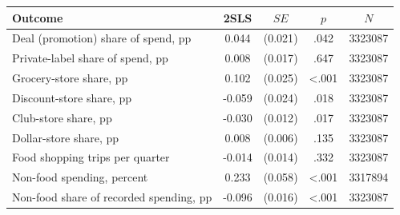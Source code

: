 \setlength{\tabcolsep}{4pt}
\begin{tabular}{
    l
    S[table-format=-1.3, table-space-text-post=\sym{***}, table-align-text-after=false]
    S[table-format=1.3, table-space-text-pre={(}, table-align-text-before=false, table-space-text-post={)}, table-align-text-after=false]
    S[table-format=<1.3, print-zero-integer=false]
    S[table-format=9]
}
\toprule
Outcome & {2SLS} & {\(\mathit{SE}\)} & {\(p\)} & {\(N\)} \\
\midrule
Deal (promotion) share of spend, pp & 0.044\sym{**} & {(}0.021{)} & .042 & 3323087 \\
Private-label share of spend, pp & 0.008 & {(}0.017{)} & .647 & 3323087 \\
Grocery-store share, pp & 0.102\sym{***} & {(}0.025{)} & <.001 & 3323087 \\
Discount-store share, pp & -0.059\sym{**} & {(}0.024{)} & .018 & 3323087 \\
Club-store share, pp & -0.030\sym{**} & {(}0.012{)} & .017 & 3323087 \\
Dollar-store share, pp & 0.008 & {(}0.006{)} & .135 & 3323087 \\
Food shopping trips per quarter & -0.014 & {(}0.014{)} & .332 & 3323087 \\
Non-food spending, percent & 0.233\sym{***} & {(}0.058{)} & <.001 & 3317894 \\
Non-food share of recorded spending, pp & -0.096\sym{***} & {(}0.016{)} & <.001 & 3323087 \\
\bottomrule
\end{tabular}
